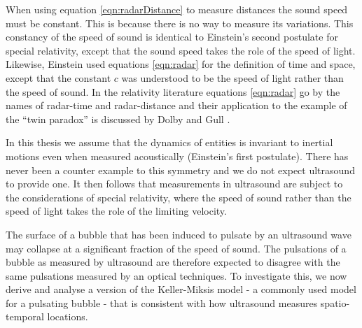 \documentclass[10pt, fleqn,draft,showtrims,oldfontcommands]{article} %
\newcommand{\eqnref}[1]{\ref{eqn:#1}}
\begin{document}

When using equation \eqnref{radarDistance} to measure distances the sound speed must be constant.
This is because there is no way to measure its variations.
This constancy of the speed of sound is identical to Einstein's  second postulate for special relativity\cite{Einstein1905},
except that the sound speed takes the role of the speed of light.
Likewise, Einstein used equations \eqnref{radar} for the definition of time and space, 
except that  the  constant $c$ was understood to be the speed of light rather than the speed of sound.
In the relativity literature equations \eqnref{radar} go by the names of radar-time 
and radar-distance and their application to the example of the ``twin paradox'' is discussed by Dolby and Gull  \cite{Dolby2001}.

In this thesis we  assume that the dynamics of entities is invariant to inertial motions even when measured acoustically (Einstein's first postulate).
There has never been a counter example to this symmetry and we do not expect ultrasound to provide one.
It then follows that measurements in ultrasound are subject to the considerations of special relativity,
where the speed of sound rather than the speed of light takes the role of the limiting velocity.

The surface of a  bubble that has been induced to pulsate by an ultrasound wave may collapse at a significant fraction of the speed of sound\cite{Neppiras1980}.
The pulsations of a bubble as measured by ultrasound are therefore expected to disagree with the same pulsations measured by an optical techniques.
To investigate this, we now derive and analyse a version of the Keller-Miksis model\cite{Keller1980} 
- a commonly used model for a pulsating bubble - that is consistent with how ultrasound measures spatio-temporal locations.
\end{document}
